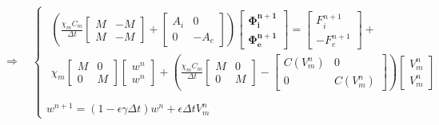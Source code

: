\documentclass[a4paper]{article}
\theoremstyle{definition}
\begin{document}
\begin{equation}
\Rightarrow \quad 
\begin{cases}
\begin{gathered}
\left(
	\frac{\chi_m C_m}{\Delta t} \begin{bmatrix}M & -M \\ M & -M\end{bmatrix}
	+ \begin{bmatrix} A_i & 0 \\ 0 & -A_e \end{bmatrix}
	\right) \begin{bmatrix} \bm{\Phi_i^{n+1}} \\ \bm{\Phi_e^{n+1}}  \end{bmatrix} =
	\begin{bmatrix} F_i^{n+1} \\ -F_e^{n+1} \end{bmatrix} + \\
	\chi_m\begin{bmatrix} M & 0 \\ 0 & M \end{bmatrix} \begin{bmatrix} w^n \\ w^n \end{bmatrix} +
	\left(\frac{\chi_mC_m}{\Delta t}\begin{bmatrix} M & 0 \\ 0 & M \end{bmatrix}
	- \begin{bmatrix} C(V_m^n) & 0 \\ 0 & C(V_m^n)\end{bmatrix} 
	\right) \begin{bmatrix} V_m^n \\ V_m^n \end {bmatrix}
	 \end{gathered} \\ \\
	w^{n+1} = (1-\epsilon \gamma \Delta t) w^n + \epsilon \Delta tV_m^n
\end{cases}
\end{equation}
\end{document}
